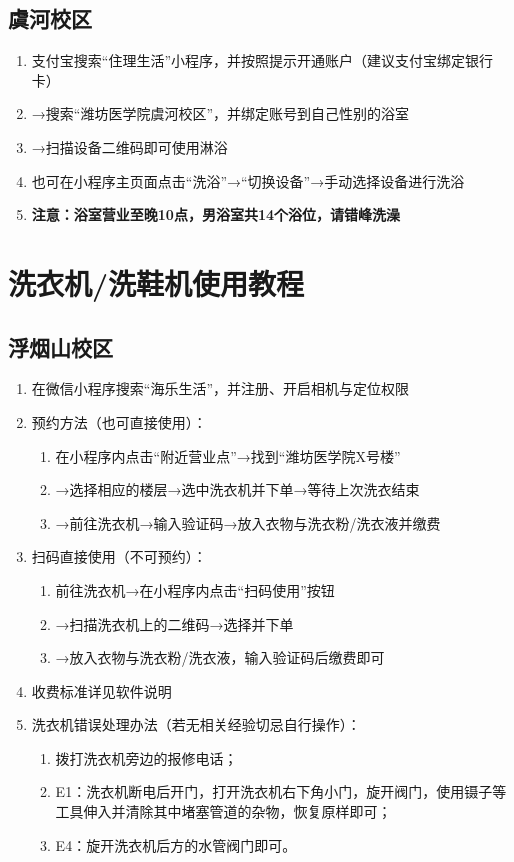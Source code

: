 \subsection[虞河校区]{虞河校区}
\label{shower_software_y}
\begin{enumerate}
      \item 支付宝搜索“住理生活”小程序，并按照提示开通账户（建议支付宝绑定银行卡）
      \item →搜索“潍坊医学院虞河校区”，并绑定账号到自己性别的浴室
      \item →扫描设备二维码即可使用淋浴
      \item 也可在小程序主页面点击“洗浴”→“切换设备”→手动选择设备进行洗浴
      \item \textbf{注意：浴室营业至晚10点，男浴室共14个浴位，请错峰洗澡}
\end{enumerate}

\section[洗衣机/洗鞋机使用教程]{洗衣机/洗鞋机使用教程}
\subsection[浮烟山校区]{浮烟山校区}
\label{washing_machine_f}
\begin{enumerate}
      \item 在微信小程序搜索“海乐生活”，并注册、开启相机与定位权限
      \item 预约方法（也可直接使用）：
            \begin{enumerate}
                  \item 在小程序内点击“附近营业点”→找到“潍坊医学院X号楼”
                  \item →选择相应的楼层→选中洗衣机并下单→等待上次洗衣结束
                  \item →前往洗衣机→输入验证码→放入衣物与洗衣粉/洗衣液并缴费
            \end{enumerate}
      \item 扫码直接使用（不可预约）：
            \begin{enumerate}
                  \item 前往洗衣机→在小程序内点击“扫码使用”按钮
                  \item →扫描洗衣机上的二维码→选择并下单
                  \item →放入衣物与洗衣粉/洗衣液，输入验证码后缴费即可
            \end{enumerate}
      \item 收费标准详见软件说明
      \item 洗衣机错误处理办法（若无相关经验切忌自行操作）：
            \begin{enumerate}
                  \item 拨打洗衣机旁边的报修电话；
                  \item E1：洗衣机断电后开门，打开洗衣机右下角小门，旋开阀门，使用镊子等工具伸入并清除其中堵塞管道的杂物，恢复原样即可；
                  \item E4：旋开洗衣机后方的水管阀门即可。
            \end{enumerate}
\end{enumerate}
